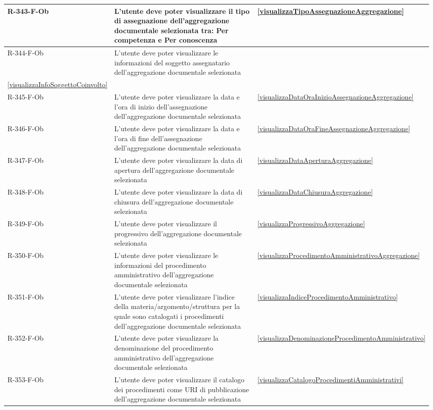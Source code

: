 \begin{longtable}{|p{2.5cm}|p{9.5cm}|p{2.5cm}|}
\hline
R-343-F-Ob & L'utente deve poter visualizzare il tipo di assegnazione dell'aggregazione documentale selezionata tra: Per competenza e Per conoscenza & \ref{visualizzaTipoAssegnazioneAggregazione} \\
\hline
R-344-F-Ob & L'utente deve poter visualizzare le informazioni del soggetto assegnatario dell'aggregazione documentale selezionata &  \begin{tabular}[t]{@{}l} \ref{visualizzaAssegnazioneAggregazione}\\ \ref{visualizzaInfoSoggettoCoinvolto} \end{tabular} \\
\hline
R-345-F-Ob & L'utente deve poter visualizzare la data e l'ora di inizio dell'assegnazione dell'aggregazione documentale selezionata & \ref{visualizzaDataOraInizioAssegnazioneAggregazione} \\
\hline
R-346-F-Ob & L'utente deve poter visualizzare la data e l'ora di fine dell'assegnazione dell'aggregazione documentale selezionata & \ref{visualizzaDataOraFineAssegnazioneAggregazione} \\
\hline
R-347-F-Ob & L'utente deve poter visualizzare la data di apertura dell'aggregazione documentale selezionata & \ref{visualizzaDataAperturaAggregazione} \\
\hline
R-348-F-Ob & L'utente deve poter visualizzare la data di chiusura dell'aggregazione documentale selezionata & \ref{visualizzaDataChiusuraAggregazione} \\
\hline
R-349-F-Ob & L'utente deve poter visualizzare il progressivo dell'aggregazione documentale selezionata & \ref{visualizzaProgressivoAggregazione} \\
\hline
R-350-F-Ob & L'utente deve poter visualizzare le informazioni del procedimento amministrativo dell'aggregazione documentale selezionata & \ref{visualizzaProcedimentoAmministrativoAggregazione} \\
\hline
R-351-F-Ob & L'utente deve poter visualizzare l'indice della materia/argomento/struttura per la quale sono catalogati i procedimenti dell'aggregazione documentale selezionata & \ref{visualizzaIndiceProcedimentoAmministrativo} \\
\hline
R-352-F-Ob & L'utente deve poter visualizzare la denominazione del procedimento amministrativo dell'aggregazione documentale selezionata & \ref{visualizzaDenominazioneProcedimentoAmministrativo} \\
\hline
R-353-F-Ob & L'utente deve poter visualizzare il catalogo dei procedimenti come URI di pubblicazione dell'aggregazione documentale selezionata & \ref{visualizzaCatalogoProcedimentiAmministrativi} \\

\end{longtable}
